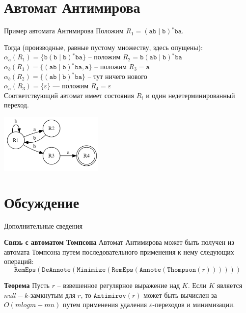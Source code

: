 \documentclass[mathserif]{beamer}
\def\Thompson{\mathtt{Thompson}}
\def\Antimirov{\mathtt{Antimirov}}
\def\RemEps{\mathtt{RemEps}}
\def\DeAnnote{\mathtt{DeAnnote}}
\def\Annote{\mathtt{Annote}}
\def\Minimize{\mathtt{Minimize}}
\def\alter{\ensuremath{\mathrel{\vert}}}%
\def\star{\ensuremath{^{*}}}%
\def\regexpstr#1{\mathtt{#1}}%
\newcommand{\empt}{\varepsilon} %
\begin{document}
\section{Автомат Антимирова}
\begin{frame}{Пример автомата Антимирова}
    \vspace{-5pt}
    Положим $R_{1} = (\regexpstr{ab} \alter \regexpstr{b})\star \regexpstr{ba}$. %

    Тогда (производные, равные пустому множеству, здесь опущены):\\
    $\alpha_{a}(R_{1}) = \{\regexpstr{b}(\regexpstr{b}\alter \regexpstr{b})\star\regexpstr{ba}\}$ -- положим $R_{2} = \regexpstr{b}(\regexpstr{ab}\alter \regexpstr{b})\star\regexpstr{ba}$\\  %
    $\alpha_{b}(R_{1}) = \{(\regexpstr{ab}\alter \regexpstr{b})\star\regexpstr{ba}, \regexpstr{a}\}$ -- положим $R_{3} = \regexpstr{a}$\\  %
    $\alpha_{b}(R_{2}) = \{(\regexpstr{ab}\alter \regexpstr{b})\star \regexpstr{ba}\}$ -- тут ничего нового\\  %
    $\alpha_{a}(R_{3}) = \{\empt\}$ — положим $R_{4} = \empt$\\  %
    Соответствующий автомат имеет состояния $R_{i}$ и один недетерминированный переход.

    \includegraphics[width=2in, keepaspectratio]{antimirov1.png} %
\end{frame}

\section{Обсуждение}
\begin{frame}{Дополнительные сведения}
    \begin{block}{\bf Связь с автоматом Томпсона}
        Автомат Антимирова может быть получен из автомата Томпсона путем последовательного применения к нему следующих операций:
        \[\RemEps(\DeAnnote(\Minimize(\RemEps(\Annote(\Thompson(r))))))\] %
    \end{block}
    \begin{block}{\bf Теорема}
        Пусть $r$ -- взвешенное регулярное выражение над $K$. Если $K$ является $null-k$-замкнутым для $r$, то $\Antimirov(r)$ может быть вычислен за $O(m log m + mn)$ путем применения удаления $\empt$-переходов и минимизации.
    \end{block}
\end{frame}
\end{document}
